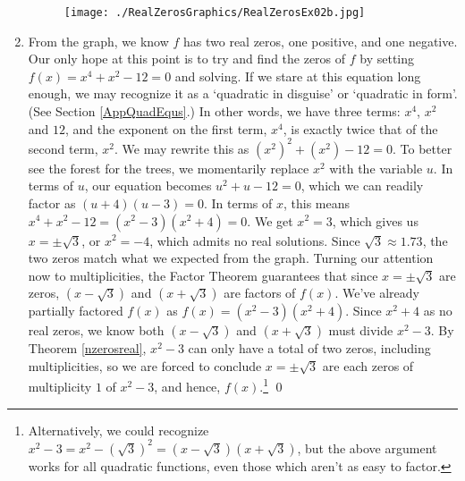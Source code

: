 \begin{ex}
\begin{enumerate}
\begin{figure}
\begin{center}
\texttt{[image: ./RealZerosGraphics/RealZerosEx02b.jpg]}

\caption{}
\label{fig:yeqfxzoomed}
\end{center} 
\end{figure}

\item  From the graph, we know $f$ has two real zeros, one positive, and one negative.  Our only hope at this point is to try and find the zeros of $f$ by setting $f(x)=x^4+x^2-12=0$ and solving.  If we stare at this equation long enough, we may recognize it as a `quadratic in disguise' or `quadratic in form'. (See Section \ref{AppQuadEqus}.)   In other words, we have three terms: $x^4$, $x^2$ and $12$, and the exponent on the first term, $x^4$, is exactly twice that of the second term, $x^2$.  We may rewrite this as $\left(x^2\right)^2 + \left(x^2\right) - 12 = 0$.  To better see the forest for the trees, we momentarily replace $x^2$ with the variable $u$.  In terms of $u$, our equation becomes $u^2 + u - 12 = 0$, which we can readily factor as $(u+4)(u-3) = 0$.  In terms of $x$, this means $x^4+x^2-12= \left(x^2-3\right) \left(x^2 + 4 \right)=0$. We get $x^2 = 3$, which gives us $x = \pm \sqrt{3}$, or $x^2=-4$, which admits no real solutions.  Since $\sqrt{3} \approx 1.73$, the two zeros match what we expected from the graph.  Turning our attention now to multiplicities, the Factor Theorem guarantees that since $x = \pm \sqrt{3}$ are zeros, $(x- \sqrt{3})$ and $(x + \sqrt{3})$ are factors of $f(x)$.  We've already partially factored  $f(x)$ as $f(x)  = \left(x^2-3\right) \left(x^2 + 4 \right)$.  Since $x^2+4$ as no real zeros, we know both $(x-\sqrt{3})$ and $(x+\sqrt{3})$ must divide $x^2-3$.  By Theorem \ref{nzerosreal},  $x^2-3$ can only have a total of two zeros, including multiplicities, so we are forced to conclude $x = \pm \sqrt{3}$ are each zeros of multiplicity $1$ of $x^2-3$, and hence, $f(x)$.\footnote{Alternatively, we could recognize $x^2 -3 = x^2-(\sqrt{3})^2 = (x-\sqrt{3})(x+\sqrt{3})$, but the above argument works for all quadratic functions, even those which aren't as easy to factor.} \qed

\end{enumerate}

\label{usubex}

\end{ex}

